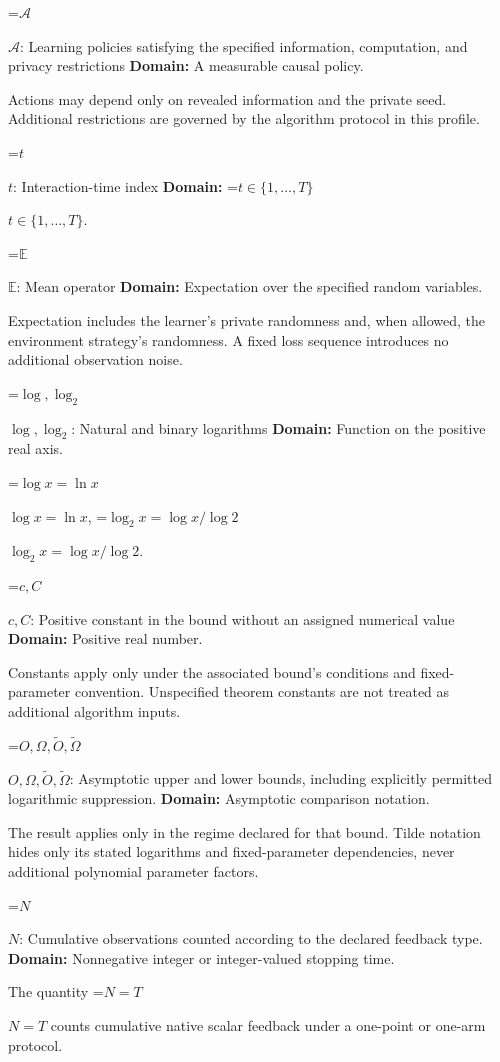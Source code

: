 \documentclass[10pt,a4paper]{article}
\newcommand{\AtlasMath}[1]{\par\begingroup\centering\setbox0=\hbox{$\displaystyle #1$}\ifdim\wd0>1.4\linewidth\typeout{ATLAS WIDE FORMULA: \the\wd0}\fi\ifdim\wd0>\linewidth\resizebox{\linewidth}{!}{\box0}\else\box0\fi\par\endgroup}
\newcommand{\AtlasInlineMath}[1]{\begingroup\setbox0=\hbox{$#1$}\ifdim\wd0>.4\linewidth\endgroup\AtlasMath{#1}\else\endgroup$#1$\fi}
\begin{document}
\AtlasInlineMath{\mathcal A}: Learning policies satisfying the specified information, computation, and privacy restrictions \textbf{Domain:} A measurable causal policy.

Actions may depend only on revealed information and the private seed. Additional restrictions are governed by the algorithm protocol in this profile.

\AtlasInlineMath{t}: Interaction-time index \textbf{Domain:} \AtlasInlineMath{t\in\{1,\ldots,T\}}.

\AtlasInlineMath{\mathbb E}: Mean operator \textbf{Domain:} Expectation over the specified random variables.

Expectation includes the learner's private randomness and, when allowed, the environment strategy's randomness. A fixed loss sequence introduces no additional observation noise.

\AtlasInlineMath{\log,\log_2}: Natural and binary logarithms \textbf{Domain:} Function on the positive real axis.

\AtlasInlineMath{\log x=\ln x}, \AtlasInlineMath{\log_2x=\log x/\log2}.

\AtlasInlineMath{c,C}: Positive constant in the bound without an assigned numerical value \textbf{Domain:} Positive real number.

Constants apply only under the associated bound’s conditions and fixed-parameter convention. Unspecified theorem constants are not treated as additional algorithm inputs.

\AtlasInlineMath{O,\Omega,\widetilde O,\widetilde\Omega}: Asymptotic upper and lower bounds, including explicitly permitted logarithmic suppression. \textbf{Domain:} Asymptotic comparison notation.

The result applies only in the regime declared for that bound. Tilde notation hides only its stated logarithms and fixed-parameter dependencies, never additional polynomial parameter factors.

\AtlasInlineMath{N}: Cumulative observations counted according to the declared feedback type. \textbf{Domain:} Nonnegative integer or integer-valued stopping time.

The quantity \AtlasInlineMath{N=T} counts cumulative native scalar feedback under a one-point or one-arm protocol.
\end{document}
